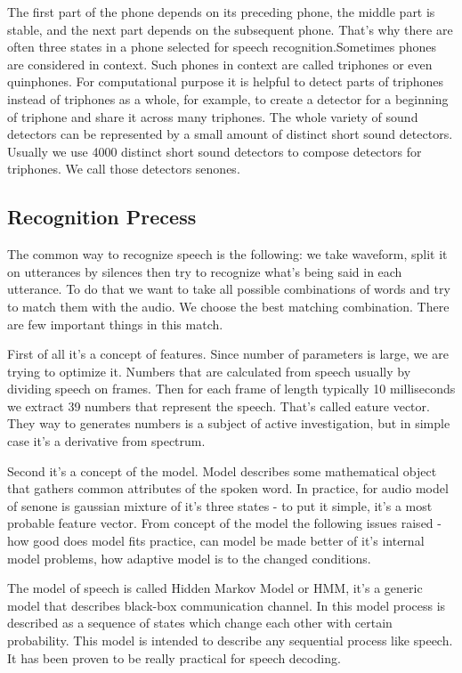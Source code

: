 \documentclass[12pt,a4paper,oldfontcommands]{memoir}
\begin{document}
The first part of the phone depends on its preceding phone, the middle part is stable, and the next part depends on the subsequent phone. That's why there are often three states in a phone selected for speech recognition.Sometimes phones are considered in context. Such phones in context are called triphones or even quinphones. For computational purpose it is helpful to detect parts of triphones instead of triphones as a whole, for example, to create a detector for a beginning of triphone and share it across many triphones. The whole variety of sound detectors can be represented by a small amount of distinct short sound detectors. Usually we use 4000 distinct short sound detectors to compose detectors for triphones. We call those detectors senones. 


\subsection{Recognition Precess}
 The common way to recognize speech is the following: we take waveform, split it on utterances by silences then try to recognize what's being said in each utterance. To do that we want to take all possible combinations of words and try to match them with the audio. We choose the best matching combination. There are few important things in this match.

First of all it's a concept of features. Since number of parameters is large, we are trying to optimize it. Numbers that are calculated from speech usually by dividing speech on frames. Then for each frame of length typically 10 milliseconds we extract 39 numbers that represent the speech. That's called eature vector. They way to generates numbers is a subject of active investigation, but in simple case it's a derivative from spectrum.

Second it's a concept of the model. Model describes some mathematical object that gathers common attributes of the spoken word. In practice, for audio model of senone is gaussian mixture of it's three states - to put it simple, it's a most probable feature vector. From concept of the model the following issues raised - how good does model fits practice, can model be made better of it's internal model problems, how adaptive model is to the changed conditions.

The model of speech is called Hidden Markov Model or HMM, it's a generic model that describes black-box communication channel. In this model process is described as a sequence of states which change each other with certain probability. This model is intended to describe any sequential process like speech. It has been proven to be really practical for speech decoding.
\end{document}
